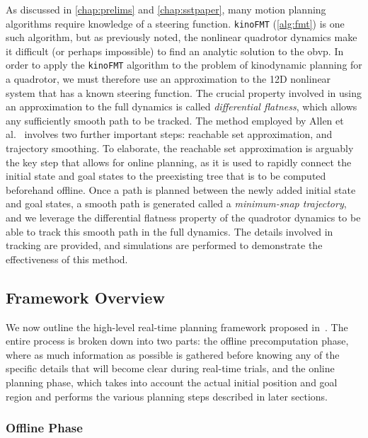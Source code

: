 As discussed in \autoref{chap:prelims} and \autoref{chap:sstpaper}, many motion planning algorithms require knowledge of a steering function. \texttt{kinoFMT} (\autoref{alg:fmt}) is one such algorithm, but as previously noted, the nonlinear quadrotor dynamics make it difficult (or perhaps impossible) to find an analytic solution to the \gls{obvp}. In order to apply the \texttt{kinoFMT} algorithm to the problem of kinodynamic planning for a quadrotor, we must therefore use an approximation to the 12D nonlinear system that has a known steering function. The crucial property involved in using an approximation to the full dynamics is called \emph{differential flatness}, which allows any sufficiently smooth path to be tracked. The method employed by Allen et al.~\cite{Allen2016} involves two further important steps: reachable set approximation, and trajectory smoothing. To elaborate, the reachable set approximation is arguably the key step that allows for online planning, as it is used to rapidly connect the initial state and goal states to the preexisting tree that is to be computed beforehand offline. Once a path is planned between the newly added initial state and goal states, a smooth path is generated called a \emph{minimum-snap trajectory}, and we leverage the differential flatness property of the quadrotor dynamics to be able to track this smooth path in the full dynamics. The details involved in tracking are provided, and simulations are performed to demonstrate the effectiveness of this method.





\subsection{Framework Overview}

We now outline the high-level real-time planning framework proposed in~\cite{Allen2016}. The entire process is broken down into two parts: the offline precomputation phase, where as much information as possible is gathered before knowing any of the specific details that will become clear during real-time trials, and the online planning phase, which takes into account the actual initial position and goal region and performs the various planning steps described in later sections.



\subsubsection{Offline Phase}

